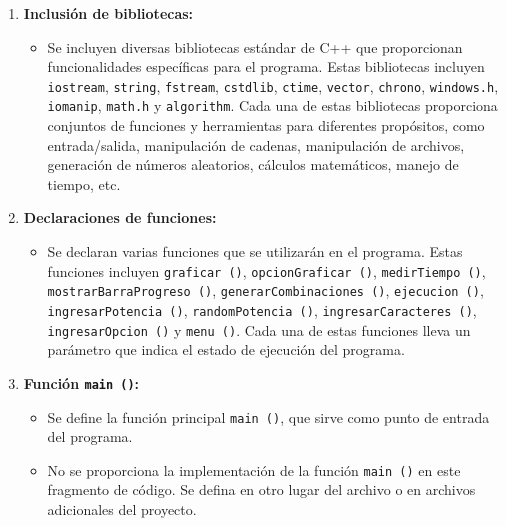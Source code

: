 \documentclass{article}
\begin{document}
                    \begin{enumerate}
                        \item \textbf{Inclusión de bibliotecas:}
                        \begin{itemize}
                            \item Se incluyen diversas bibliotecas estándar de C++ que proporcionan funcionalidades específicas para el programa. Estas bibliotecas incluyen \texttt{iostream}, \texttt{string}, \texttt{fstream}, \texttt{cstdlib}, \texttt{ctime}, \texttt{vector}, \texttt{chrono}, \texttt{windows.h}, \texttt{iomanip}, \texttt{math.h} y \texttt{algorithm}. Cada una de estas bibliotecas proporciona conjuntos de funciones y herramientas para diferentes propósitos, como entrada/salida, manipulación de cadenas, manipulación de archivos, generación de números aleatorios, cálculos matemáticos, manejo de tiempo, etc.
                        \end{itemize}

                        \item \textbf{Declaraciones de funciones:}
                        \begin{itemize}
                            \item Se declaran varias funciones que se utilizarán en el programa. Estas funciones incluyen
                            \texttt{graficar ()}, \texttt{opcionGraficar ()}, \texttt{medirTiempo ()}, \texttt{mostrarBarraProgreso ()},
                            \texttt{generarCombinaciones ()}, \texttt{ejecucion ()}, \texttt{ingresarPotencia ()}, \texttt{randomPotencia ()},
                            \texttt{ingresarCaracteres ()}, \texttt{ingresarOpcion ()} y \texttt{menu ()}. Cada una de estas funciones lleva un
                            parámetro que indica el estado de ejecución del programa.
                        \end{itemize}

                        \item \textbf{Función \texttt{main ()}:}
                        \begin{itemize}
                            \item Se define la función principal \texttt{main ()}, que sirve como punto de entrada del programa.
                            \item No se proporciona la implementación de la función \texttt{main ()} en este fragmento de código. Se
                            defina en otro lugar del archivo o en archivos adicionales del proyecto.
                        \end{itemize}
                    \end{enumerate}
\end{document}
